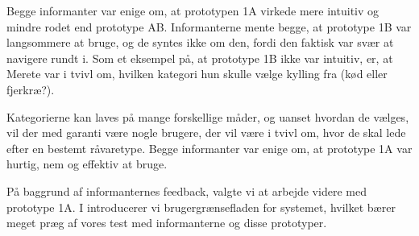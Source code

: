 Begge informanter var enige om, at prototypen 1A virkede mere intuitiv og mindre rodet end prototype AB. Informanterne mente begge, at prototype 1B var langsommere at bruge, og de syntes ikke om den, fordi den faktisk var svær at navigere rundt i. Som et eksempel på, at prototype 1B ikke var intuitiv, er, at Merete var i tvivl om, hvilken kategori hun skulle vælge \fx kylling fra (kød eller fjerkræ?). 

Kategorierne kan laves på mange forskellige måder, og uanset hvordan de vælges, vil der med garanti være nogle brugere, der vil være i tvivl om, hvor de skal lede efter en bestemt råvaretype. Begge informanter var enige om, at prototype 1A var hurtig, nem og effektiv at bruge.

På baggrund af informanternes feedback, valgte vi at arbejde videre med prototype 1A. I  introducerer vi brugergrænsefladen for systemet, hvilket bærer meget præg af vores test med informanterne og disse prototyper.
